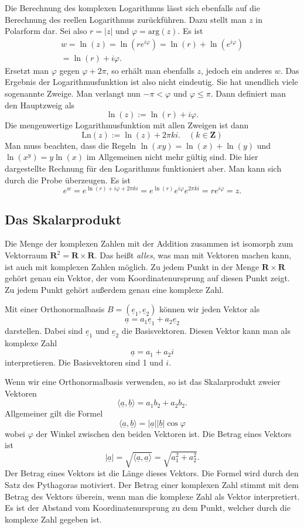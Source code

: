 \documentclass[a4paper,10pt,fleqn,twocolumn,twoside]{article}
\begin{document}
Die Berechnung des komplexen Logarithmus lässt sich ebenfalls
auf die Berechnung des reellen Logarithmus zurückführen. Dazu stellt
man \(z\) in Polarform dar. Sei also \(r=|z|\) und
\(\varphi = \mathrm{arg}(z)\). Es ist
\begin{gather*}
w = \ln(z) = \ln(re^{i\varphi})
= \ln(r)+\ln(e^{i\varphi})\\
= \ln(r)+i\varphi.
\end{gather*}
Ersetzt man \(\varphi\) gegen \(\varphi+2\pi\), so erhält man
ebenfalls \(z\), jedoch ein anderes \(w\). Das Ergebnis der
Logarithmusfunktion ist also nicht eindeutig. Sie hat unendlich
viele sogenannte Zweige. Man verlangt nun \(-\pi<\varphi\) und
\(\varphi\le\pi\). Dann definiert man den Hauptzweig als
\[\ln(z):=\ln(r)+i\varphi.\]
Die mengenwertige Logarithmusfunktion mit allen Zweigen ist dann
\[\mathrm{Ln}(z):=\ln(z)+2\pi ki.\quad(k\in\mathbf Z)\]
Man muss beachten, dass die Regeln \(\ln(xy)=\ln(x)+\ln(y)\)
und \(\ln(x^y)=y\ln(x)\) im Allgemeinen nicht mehr gültig sind.
Die hier dargestellte Rechnung für den Logarithmus funktioniert aber.
Man kann sich durch die Probe überzeugen. Es ist
\[e^w = e^{\ln(r)+i\varphi+2\pi ki}
= e^{\ln(r)}e^{i\varphi}e^{2\pi ki} = re^{i\varphi} = z.\]

\subsection{Das Skalarprodukt}

Die Menge der komplexen Zahlen mit der Addition zusammen ist
isomorph zum Vektorraum
\(\mathbf{R}^2 = \mathbf{R}\times\mathbf{R}\).
Das heißt \textit{alles}, was man mit Vektoren machen kann, ist auch
mit komplexen Zahlen möglich. Zu jedem Punkt in der Menge
\(\mathbf{R}\times\mathbf{R}\) gehört genau ein Vektor, der vom
Koordinatenursprung auf diesen Punkt zeigt. Zu jedem Punkt gehört
außerdem genau eine komplexe Zahl.

Mit einer Orthonormalbasis \(B=(\underline e_1,\underline e_2)\)
können wir jeden Vektor als
\[\underline a = a_1\underline e_1+a_2\underline e_2\]
darstellen. Dabei sind \(\underline e_1\) und \(\underline e_2\) die
Basisvektoren. Diesen Vektor kann man als komplexe Zahl
\[\underline a = a_1+a_2i\]
interpretieren. Die Basisvektoren sind 1 und \(i\).

Wenn wir eine Orthonormalbasis verwenden, so ist das Skalarprodukt
zweier Vektoren
\[\langle \underline a, \underline b\rangle = a_1b_2+a_2b_2.\]
\noindent
Allgemeiner gilt die Formel
\[\langle \underline a, \underline b\rangle
= |\underline a||\underline b|\cos\varphi\]
wobei \(\varphi\) der Winkel zwischen den beiden Vektoren ist.
Die Betrag eines Vektors ist
\[|\underline a| = \sqrt{\langle \underline a, \underline a\rangle}
= \sqrt{a_1^2+a_2^2}.\]
Der Betrag eines Vektors ist die Länge dieses Vektors. Die Formel wird
durch den Satz des Pythagoras motiviert. Der Betrag einer komplexen
Zahl stimmt mit dem Betrag des Vektors überein, wenn man die komplexe
Zahl als Vektor interpretiert. Es ist der Abstand vom
Koordinatenursprung zu dem Punkt, welcher durch die komplexe Zahl
gegeben ist.
\end{document}

